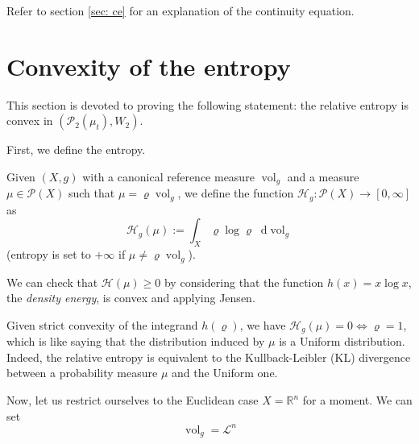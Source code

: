 \documentclass[a4paper,12pt,reqno]{amsbook}
\theoremstyle{definition} %
\newcommand*\de{\mathop{}\!\mathrm{d}}
\newcommand{\1}{\mathbbm{1}}
\newcommand{\mL}{\mathscr{L}}
\newcommand{\mP}{\mathscr{P}}
\newcommand{\cH}{\mathcal{H}} %
\newcommand{\R}{\ensuremath{\mathbb{R}}}
\DeclareMathOperator{\vol}{vol}
\def\vol{\mathop{\mathrm{vol}}\nolimits}
\theoremstyle{plain}
\theoremstyle{remark}
\begin{document}
Refer to section \ref{sec: ce} for an explanation of the continuity equation.

\section{Convexity of the entropy}
\label{sec: Wconvx} This section is devoted to proving the following statement: the relative entropy is convex in $(\mP_2(\mu_t), W_2)$. 

First, we define the entropy. 

\begin{definition}
    Given $(X,g)$ with a canonical reference measure $\vol_g$ and a measure $\mu \in \mP(X)$ such that $\mu = \varrho \vol_g$, we define the function $\cH_g:\mP(X) \to [0,\infty]$ as
\[
\mathcal{H}_g(\mu) := \int_X \varrho \log \varrho \de{\vol_g}
\]
(entropy is set to $+\infty$ if $\mu \neq \varrho \vol_g$). 
\end{definition}

We can check that $\cH(\mu) \ge 0$ by considering that the function $h(x) = x \log x$, the \emph{density energy}, is convex and applying Jensen. 

\begin{remark}
    Given strict convexity of the integrand $h(\varrho)$, we have $\cH_g(\mu)=0 \Longleftrightarrow \varrho=1$, which is like saying that the distribution induced by $\mu$ is a Uniform distribution. Indeed, the relative entropy is equivalent to the Kullback-Leibler (KL) divergence between a probability measure $\mu$ and the Uniform one. 
\end{remark}

Now, let us restrict ourselves to the Euclidean case $X= \R^n$ for a moment. We can set 
\[
\vol_g = \mL^n
\]
\end{document}

